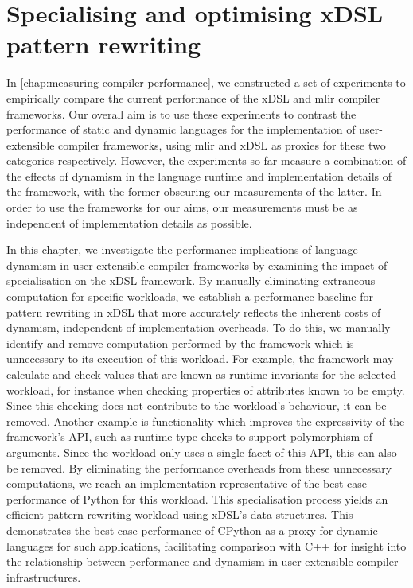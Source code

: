\chapter{Specialising and optimising xDSL pattern rewriting}
\label{chap:specialising-optimising-pattern-rewriting}

In \autoref{chap:measuring-compiler-performance}, we constructed a set of experiments to empirically compare the current performance of the xDSL and \ac{mlir} compiler frameworks.
Our overall aim is to use these experiments to contrast the performance of static and dynamic languages for the implementation of user-extensible compiler frameworks, using \ac{mlir} and xDSL as proxies for these two categories respectively.
However, the experiments so far measure a combination of the effects of dynamism in the language runtime and implementation details of the framework, with the former obscuring our measurements of the latter.
In order to use the frameworks for our aims, our measurements must be as independent of implementation details as possible.

In this chapter, we investigate the performance implications of language dynamism in user-extensible compiler frameworks by examining the impact of specialisation on the xDSL framework. By manually eliminating extraneous computation for specific workloads, we establish a performance baseline for pattern rewriting in xDSL that more accurately reflects the inherent costs of dynamism, independent of implementation overheads.
To do this, we manually identify and remove computation performed by the framework which is unnecessary to its execution of this workload. For example, the framework may calculate and check values that are known as runtime invariants for the selected workload, for instance when checking properties of attributes known to be empty.
Since this checking does not contribute to the workload's behaviour, it can be removed. Another example is functionality which improves the expressivity of the framework's API, such as runtime type checks to support polymorphism of arguments. Since the workload only uses a single facet of this API, this can also be removed.
By eliminating the performance overheads from these unnecessary computations, we reach an implementation representative of the best-case performance of Python for this workload.
This specialisation process yields an efficient pattern rewriting workload using xDSL's data structures. This demonstrates the best-case performance of CPython as a proxy for dynamic languages for such applications, facilitating comparison with C++ for insight into the relationship between performance and dynamism in user-extensible compiler infrastructures.


